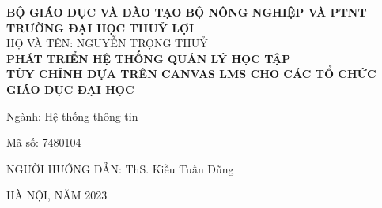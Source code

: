 \documentclass[main-report.tex]{subfiles}
\begin{document}
\begin{titlepage}
\thispagestyle{empty}

\begin{center}
{\bf\large BỘ GIÁO DỤC VÀ ĐÀO TẠO \hspace{1.5cm} BỘ NÔNG NGHIỆP VÀ PTNT}\\
{\bf\subtitlesize TRƯỜNG ĐẠI HỌC THUỶ LỢI}\\[3cm]


{\large HỌ VÀ TÊN: NGUYỄN TRỌNG THUỶ}\\
\vspace{3\baselineskip}
{\bf\LARGE PHÁT TRIỂN HỆ THỐNG QUẢN LÝ HỌC TẬP}\\
{\bf\LARGE TÙY CHỈNH DỰA TRÊN CANVAS LMS CHO CÁC TỔ CHỨC GIÁO DỤC ĐẠI HỌC}\\[5cm]
\end{center}

\begin{center}
    {Ngành: Hệ thống thông tin}
\end{center}
\begin{center}
    {Mã số: 7480104}
\end{center}
\vspace{4cm}
\begin{center}
    {NGƯỜI HƯỚNG DẪN: ThS. Kiều Tuấn Dũng}
\end{center}
\vspace{4cm}
\begin{center}
{HÀ NỘI, NĂM 2023}
\end{center}
\end{titlepage}
\end{document}
